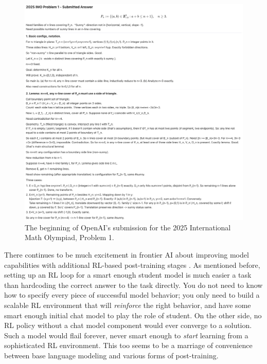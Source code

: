 \begin{figure}[ht]
\centering
\includegraphics[scale=.19]{./images/IMO_Gold.png}
\caption[From Alexander Wei, OpenAI. Complete answer transcripts available
    here: \cite{wei2025imo}]{ The beginning of OpenAI's submission for the 2025
    International Math Olympiad, Problem 1. }
\label{imoGold}
\end{figure}

There continues to be much excitement in frontier AI about improving model
capabilities with additional RL-based post-training stages
\cite{silver2025experience}. As mentioned before, setting up an RL loop for a
smart enough student model is much easier a task than hardcoding the correct
answer to the task directly. You do not need to know how to specify every piece
of successful model behavior; you only need to build a scalable RL environment
that will \emph{reinforce} the right behavior, and have some smart enough
initial chat model to play the role of student. On the other side, no RL policy
without a chat model component would ever converge to a solution. Such a model
would flail forever, never smart enough to \emph{start} learning from a
sophisticated RL environment. This too seems to be a marriage of convenience
between base language modeling and various forms of post-training.

